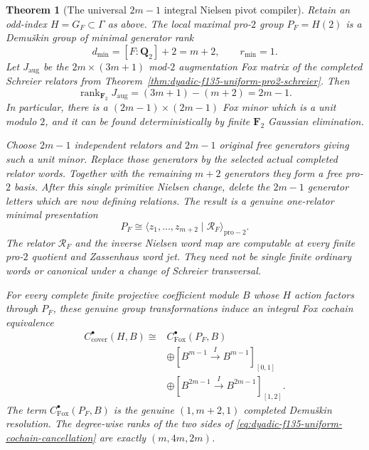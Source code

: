 \documentclass[11pt]{article}
\newtheorem{theorem}{Theorem}[section]
\theoremstyle{definition}
\begin{document}
\begin{theorem}[The universal $2m-1$ integral Nielsen pivot compiler]
\label{thm:dyadic-f135-primitive-pivot-compiler}
Retain an odd-index
$H=G_F\subset\Gamma$
as above.
The local maximal
pro-$2$ group
$P_F=H(2)$ is
a Demu\v{s}kin group
of minimal generator
rank
\begin{equation}\label{eq:dyadic-f135-local-rank}
\boxed{\qquad
d_{\min}=[F:\mathbf Q_2]+2=m+2,
\qquad r_{\min}=1.
\qquad}
\end{equation}
Let $J_{\mathrm{aug}}$
be the $2m\times(3m+1)$
\emph{mod-$2$
augmentation Fox matrix}
of the completed
Schreier relators from
Theorem~\ref{thm:dyadic-f135-uniform-pro2-schreier}.
Then
\begin{equation}\label{eq:dyadic-f135-fox-augmentation-rank}
\boxed{\qquad
\operatorname{rank}_{\mathbf F_2}
J_{\mathrm{aug}}
=(3m+1)-(m+2)=2m-1.
\qquad}
\end{equation}
In particular,
there is a
$(2m-1)\times(2m-1)$
Fox minor which is
a unit modulo $2$,
and it can be
\emph{found
deterministically}
by finite
$\mathbf F_2$
Gaussian elimination.

Choose $2m-1$
independent relators
and $2m-1$
original free
generators giving
such a unit minor.
Replace those
generators by
the selected
\emph{actual
completed relator
words}.
Together with
the remaining
$m+2$ generators
they form a
free pro-$2$ basis.
After this single
primitive Nielsen
change, delete the
$2m-1$ generator
letters which are
now defining
relations.  The
result is a genuine
one-relator minimal
presentation
\begin{equation}\label{eq:dyadic-f135-general-minimal-relation}
\boxed{\quad
P_F\cong
\langle z_1,\ldots,z_{m+2}
\mid\mathscr R_F\rangle_{\mathrm{pro}-2}.
\quad}
\end{equation}
The relator
$\mathscr R_F$ and
the inverse Nielsen
word map are
\emph{computable
at every finite
pro-$2$ quotient
and Zassenhaus
word jet}.
They need not be
single finite
ordinary words
or canonical under
a change of
Schreier transversal.

For every complete
finite projective
coefficient module
$B$ whose
$H$ action
factors through
$P_F$, these
genuine group
transformations
induce an
\emph{integral
Fox cochain}
equivalence
\begin{equation}\label{eq:dyadic-f135-uniform-cochain-cancellation}
\boxed{
\begin{aligned}
C_{\mathrm{cover}}^\bullet(H,B)
\cong {}&
C_{\mathrm{Fox}}^\bullet(P_F,B)\\
&\oplus
[B^{m-1}\xrightarrow{I}B^{m-1}]_{[0,1]}\\
&\oplus
[B^{2m-1}\xrightarrow{I}B^{2m-1}]_{[1,2]} .
\end{aligned}}
\end{equation}
The term
$C_{\mathrm{Fox}}^\bullet(P_F,B)$
is the genuine
$(1,m+2,1)$
completed Demu\v{s}kin
resolution.
The degree-wise
ranks of the
two sides of
\eqref{eq:dyadic-f135-uniform-cochain-cancellation}
are exactly
$(m,4m,2m)$.


\end{theorem}
\end{document}
